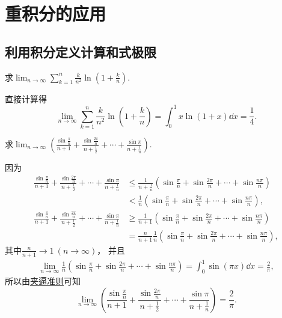 \section{重积分的应用}
\subsection{利用积分定义计算和式极限}
\begin{example}
求\(\lim_{n\to\infty} \sum_{k=1}^n \frac{k}{n^2} \ln(1+\frac{k}{n})\).
\begin{solution}
直接计算得\begin{equation*}
	\lim_{n\to\infty} \sum_{k=1}^n \frac{k}{n^2} \ln(1+\frac{k}{n})
	= \int_0^1 x \ln(1+x) \dd{x}
	= \frac14.
\end{equation*}
\end{solution}
\end{example}

\begin{example}
求\(\lim_{n\to\infty} \left( \frac{\sin\frac{\pi}{n}}{n+1} + \frac{\sin\frac{2\pi}{n}}{n+\frac12} + \dotsb + \frac{\sin\pi}{n+\frac1n} \right)\).
\begin{solution}
因为\begin{align*}
	\frac{\sin\frac{\pi}{n}}{n+1} + \frac{\sin\frac{2\pi}{n}}{n+\frac12} + \dotsb + \frac{\sin\pi}{n+\frac1n}
	&\leq \frac1{n+\frac1n} \left( \sin\frac{\pi}{n} + \sin\frac{2\pi}{n} + \dotsb + \sin\frac{n\pi}{n} \right) \\
	&< \frac1n \left( \sin\frac{\pi}{n} + \sin\frac{2\pi}{n} + \dotsb + \sin\frac{n\pi}{n} \right), \\
	\frac{\sin\frac{\pi}{n}}{n+1} + \frac{\sin\frac{2\pi}{n}}{n+\frac12} + \dotsb + \frac{\sin\pi}{n+\frac1n}
	&\geq \frac1{n+1} \left( \sin\frac{\pi}{n} + \sin\frac{2\pi}{n} + \dotsb + \sin\frac{n\pi}{n} \right) \\
	&= \frac{n}{n+1} \frac1n \left( \sin\frac{\pi}{n} + \sin\frac{2\pi}{n} + \dotsb + \sin\frac{n\pi}{n} \right),
\end{align*}
其中\(\frac{n}{n+1} \to 1\ (n\to\infty)\)，
并且\begin{align*}
	\lim_{n\to\infty} \frac1n \left( \sin\frac{\pi}{n} + \sin\frac{2\pi}{n} + \dotsb + \sin\frac{n\pi}{n} \right)
	= \int_0^1 \sin(\pi x) \dd{x} = \frac2\pi,
\end{align*}
所以由\hyperref[theorem:数列极限.夹逼准则]{夹逼准则}可知\[
	\lim_{n\to\infty} \left( \frac{\sin\frac{\pi}{n}}{n+1} + \frac{\sin\frac{2\pi}{n}}{n+\frac12} + \dotsb + \frac{\sin\pi}{n+\frac1n} \right)
	= \frac2\pi.
\]
\end{solution}
\end{example}

